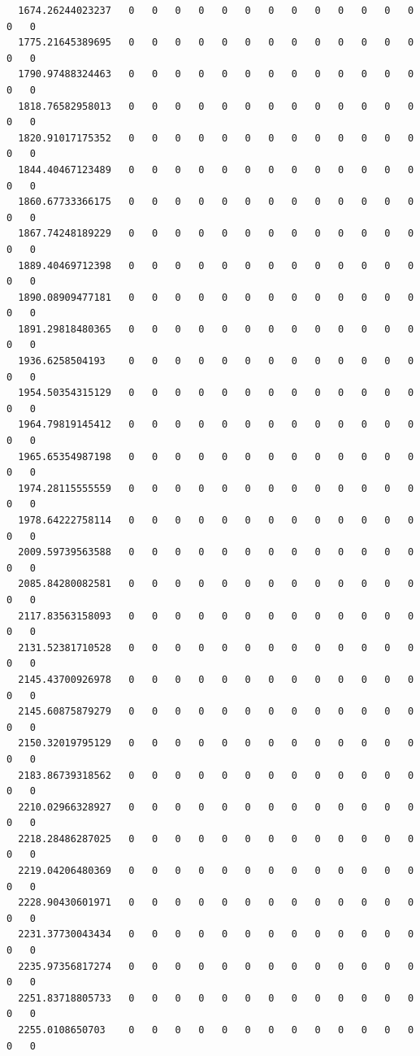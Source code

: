 \documentclass[
  letterpaper,
  DIV=11,
  numbers=noendperiod]{scrartcl}
\begin{document}
\begin{verbatim}
  1674.26244023237   0   0   0   0   0   0   0   0   0   0   0   0   0   0   0
  1775.21645389695   0   0   0   0   0   0   0   0   0   0   0   0   0   0   0
  1790.97488324463   0   0   0   0   0   0   0   0   0   0   0   0   0   0   0
  1818.76582958013   0   0   0   0   0   0   0   0   0   0   0   0   0   0   0
  1820.91017175352   0   0   0   0   0   0   0   0   0   0   0   0   0   0   0
  1844.40467123489   0   0   0   0   0   0   0   0   0   0   0   0   0   0   0
  1860.67733366175   0   0   0   0   0   0   0   0   0   0   0   0   0   0   0
  1867.74248189229   0   0   0   0   0   0   0   0   0   0   0   0   0   0   0
  1889.40469712398   0   0   0   0   0   0   0   0   0   0   0   0   0   0   0
  1890.08909477181   0   0   0   0   0   0   0   0   0   0   0   0   0   0   0
  1891.29818480365   0   0   0   0   0   0   0   0   0   0   0   0   0   0   0
  1936.6258504193    0   0   0   0   0   0   0   0   0   0   0   0   0   0   0
  1954.50354315129   0   0   0   0   0   0   0   0   0   0   0   0   0   0   0
  1964.79819145412   0   0   0   0   0   0   0   0   0   0   0   0   0   0   0
  1965.65354987198   0   0   0   0   0   0   0   0   0   0   0   0   0   0   0
  1974.28115555559   0   0   0   0   0   0   0   0   0   0   0   0   0   0   0
  1978.64222758114   0   0   0   0   0   0   0   0   0   0   0   0   0   0   0
  2009.59739563588   0   0   0   0   0   0   0   0   0   0   0   0   0   0   0
  2085.84280082581   0   0   0   0   0   0   0   0   0   0   0   0   0   0   0
  2117.83563158093   0   0   0   0   0   0   0   0   0   0   0   0   0   0   0
  2131.52381710528   0   0   0   0   0   0   0   0   0   0   0   0   0   0   0
  2145.43700926978   0   0   0   0   0   0   0   0   0   0   0   0   0   0   0
  2145.60875879279   0   0   0   0   0   0   0   0   0   0   0   0   0   0   0
  2150.32019795129   0   0   0   0   0   0   0   0   0   0   0   0   0   0   0
  2183.86739318562   0   0   0   0   0   0   0   0   0   0   0   0   0   0   0
  2210.02966328927   0   0   0   0   0   0   0   0   0   0   0   0   0   0   0
  2218.28486287025   0   0   0   0   0   0   0   0   0   0   0   0   0   0   0
  2219.04206480369   0   0   0   0   0   0   0   0   0   0   0   0   0   0   0
  2228.90430601971   0   0   0   0   0   0   0   0   0   0   0   0   0   0   0
  2231.37730043434   0   0   0   0   0   0   0   0   0   0   0   0   0   0   0
  2235.97356817274   0   0   0   0   0   0   0   0   0   0   0   0   0   0   0
  2251.83718805733   0   0   0   0   0   0   0   0   0   0   0   0   0   0   0
  2255.0108650703    0   0   0   0   0   0   0   0   0   0   0   0   0   0   0

\end{verbatim}
\end{document}
